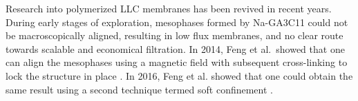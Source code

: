 \documentclass{article}
\begin{document}
  Research into polymerized LLC membranes has been revived in recent years.
  During early stages of exploration, mesophases formed by Na-GA3C11 could not be
  macroscopically aligned, resulting in low flux membranes, and no clear route
  towards scalable and economical filtration. In 2014, Feng et al.~showed that
  one can align the mesophases using a magnetic field with subsequent
  cross-linking to lock the structure in place \cite{feng_scalable_2014}. In 2016,
  Feng et al. showed that one could obtain the same result using a second
  technique termed soft confinement \cite{feng_thin_2016}.


\end{document}
